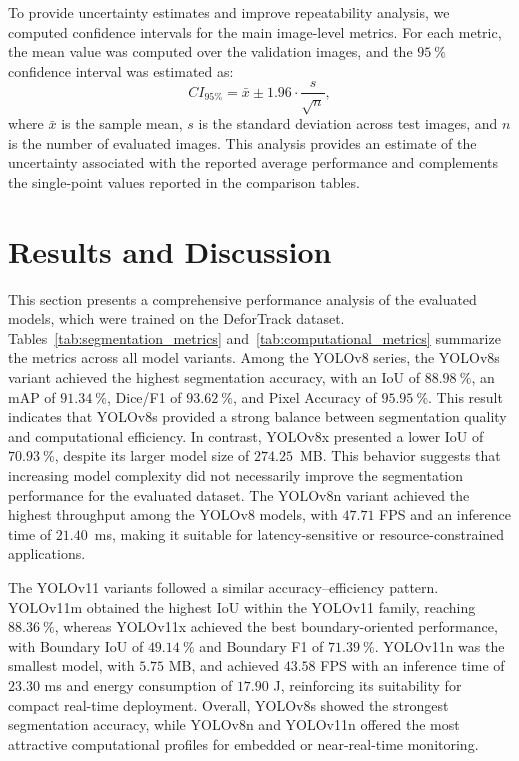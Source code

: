 \documentclass[journal,article,submit,pdftex,moreauthors]{Definitions/mdpi}
\begin{document}
To provide uncertainty estimates and improve repeatability analysis, we computed confidence intervals for the main image-level metrics. For each metric, the mean value was computed over the validation images, and the $95~\%$ confidence interval was estimated as:
\begin{equation}
CI_{95\%} = \bar{x} \pm 1.96 \cdot \frac{s}{\sqrt{n}},
\end{equation}
where $\bar{x}$ is the sample mean, $s$ is the standard deviation across test images, and $n$ is the number of evaluated images. This analysis provides an estimate of the uncertainty associated with the reported average performance and complements the single-point values reported in the comparison tables.

\section{Results and Discussion}

This section presents a comprehensive performance analysis of the evaluated models, which were trained on the DeforTrack dataset. Tables~\ref{tab:segmentation_metrics} and~\ref{tab:computational_metrics} summarize the metrics across all model variants. Among the YOLOv8 series, the YOLOv8s variant achieved the highest segmentation accuracy, with an IoU of $88.98~\%$, an mAP of $91.34~\%$, Dice/F1 of $93.62~\%$, and Pixel Accuracy of  $95.95~\%$. This result indicates that YOLOv8s provided a strong balance between segmentation quality and computational efficiency. In contrast, YOLOv8x presented a lower IoU of $70.93~\%$, despite its larger model size of $274.25$~MB. This behavior suggests that increasing model complexity did not necessarily improve the segmentation performance for the evaluated dataset. The YOLOv8n variant achieved the highest throughput among the YOLOv8 models, with $47.71$ FPS and an inference time of $21.40$~ms, making it suitable for latency-sensitive or resource-constrained applications.

The YOLOv11 variants followed a similar accuracy--efficiency pattern. YOLOv11m obtained the highest IoU within the YOLOv11 family, reaching $88.36~\%$, whereas YOLOv11x achieved the best boundary-oriented performance, with Boundary IoU of $49.14~\%$ and Boundary F1 of $71.39~\%$. YOLOv11n was the smallest model, with $5.75$ MB, and achieved $43.58$ FPS with an inference time of
$23.30$ ms and energy consumption of $17.90$ J, reinforcing its suitability for compact real-time deployment. Overall, YOLOv8s showed the strongest segmentation accuracy, while YOLOv8n and YOLOv11n offered the most attractive computational profiles for embedded or near-real-time monitoring.
\end{document}
